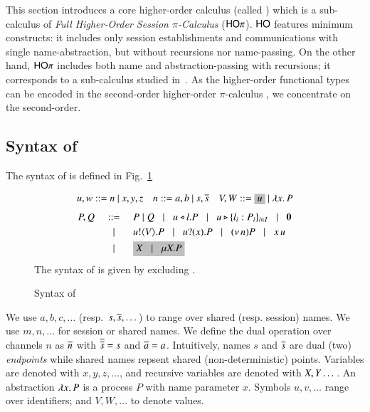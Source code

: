 \noindent This section introduces a core higher-order 
calculus (called \HO) which is a sub-calculus of 
{\em Full Higher-Order Session $\pi$-Calculus} ($\mathsf{HO}\pi$).
$\mathsf{HO}$ features minimum constructs: it includes only session establishments 
and communications 
with single name-abstraction, but  
without recursions nor name-passing.  
On the other hand, $\mathsf{HO}\pi$ includes both name and abstraction-passing 
with recursions; 
it corresponds to a sub-calculus studied 
in~\cite{tlca07}. As the higher-order functional types can be encoded in 
the second-order higher-order $\pi$-calculus 
\cite{JeffreyR05,SangiorgiD:picatomp}, 
we concentrate on the second-order. 

\subsection{Syntax of \HOp}
\label{subsec:syntax}
\noindent The syntax of \HOp is defined in Fig.~\ref{fig:syntax}
\begin{figure}[t]
\[ 
\begin{array}{lll}
u,w  ::=  n \ | \ x,y,z
& n ::= a,b  \ | \ s, \dual{s} 
& V,W  ::=   \nonhosyntax{u} \ | \ \abs{x}{P}
\end{array}
\]
\[
\begin{array}{rclllll}
P,Q & ::= &  P\Par Q \bnfbar 
 \bsel{u}{l} P \bnfbar \bbra{u}{l_i:P_i}_{i \in I} \bnfbar \inact \\[1mm]
 & \bnfbar & \bout{u}{V}{P} \bnfbar \binp{u}{x}{P} \bnfbar \news{n} P 
\bnfbar \appl{x}{u} 
\\[1mm]
     & \bnfbar & \nonhosyntax{\rvar{X} \bnfbar \recp{X}{P}}
\end{array}
\]
The syntax of \HO is given by excluding . 
\caption{Syntax of \HOp}
\label{fig:syntax}
\Hline
\end{figure}
We use $a,b,c, \dots$ (resp.~$s, \overline{s}, \dots$) 
to range over shared (resp. session) names. 
We use $m, n, \dots$ for session or shared names. 
We define the dual operation over channels $n$ as $\overline{n}$ with
$\overline{\overline{s}} = s$ and $\overline{a} = a$.
Intuitively, names $s$ and $\overline{s}$ are dual (two) \emph{endpoints} while 
shared names repsent shared (non-deterministic) points. 
Variables are denoted with $x, y, z, \dots$, 
and recursive variables are denoted with $X, Y \dots$.
An abstraction $\lambda x.\,P$ is a process $P$ with name parameter $x$.
Symbols $u, v, \dots$ range over identifiers; and  
$V, W, \dots$ to denote values. 

